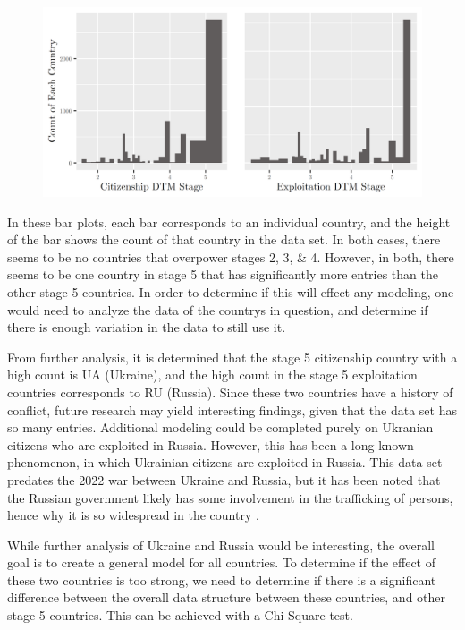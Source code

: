\documentclass{article} %
\begin{document}
\FloatBarrier
\begin{figure}[H]
	\includegraphics[width = \textwidth]{CountryCountBarplot}
\end{figure}
\FloatBarrier

In these bar plots, each bar corresponds to an individual country, and the height of the bar shows the count of that country in the data set. In both cases, there seems to be no countries that overpower stages 2, 3, \& 4. However, in both, there seems to be one country in stage 5 that has significantly more entries than the other stage 5 countries. In order to determine if this will effect any modeling, one would need to analyze the data of the countrys in question, and determine if there is enough variation in the data to still use it. 

From further analysis, it is determined that the stage 5 citizenship country with a high count is UA (Ukraine), and the high count in the stage 5 exploitation countries corresponds to RU (Russia). Since these two countries have a history of conflict, future research may yield interesting findings, given that the data set has so many entries. Additional modeling could be completed purely on Ukranian citizens who are exploited in Russia. However, this has been a long known phenomenon, in which Ukrainian citizens are exploited in Russia. This data set predates the 2022 war between Ukraine and Russia, but it has been noted that the Russian government likely has some involvement in the trafficking of persons, hence why it is so widespread in the country \parencite{RussiaTrafficking}.

While further analysis of Ukraine and Russia would be interesting, the overall goal is to create a general model for all countries. To determine if the effect of these two countries is too strong, we need to determine if there is a significant difference between the overall data structure between these countries, and other stage 5 countries. This can be achieved with a Chi-Square test.
\end{document}
